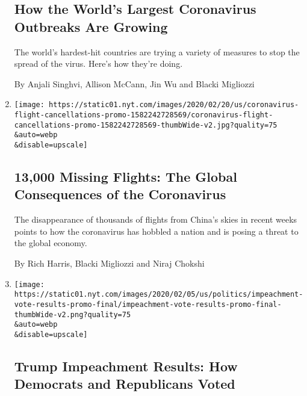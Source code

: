 \begin{enumerate}
  \hypertarget{how-the-worlds-largest-coronavirus-outbreaks-are-growing}{%
  \subsection{How the World's Largest Coronavirus Outbreaks Are
  Growing}\label{how-the-worlds-largest-coronavirus-outbreaks-are-growing}}

  The world's hardest-hit countries are trying a variety of measures to
  stop the spread of the virus. Here's how they're doing.

  By Anjali Singhvi, Allison McCann, Jin Wu and Blacki Migliozzi
\item
  \href{/interactive/2020/02/21/business/coronavirus-airline-travel.html}{}

  \texttt{[image: https://static01.nyt.com/images/2020/02/20/us/coronavirus-flight-cancellations-promo-1582242728569/coronavirus-flight-cancellations-promo-1582242728569-thumbWide-v2.jpg?quality=75\\\&auto=webp\\\&disable=upscale]}

  \hypertarget{13000-missing-flights-the-global-consequences-of-the-coronavirus}{%
  \subsection{13,000 Missing Flights: The Global Consequences of the
  Coronavirus}\label{13000-missing-flights-the-global-consequences-of-the-coronavirus}}

  The disappearance of thousands of flights from China's skies in recent
  weeks points to how the coronavirus has hobbled a nation and is posing
  a threat to the global economy.

  By Rich Harris, Blacki Migliozzi and Niraj Chokshi
\item
  \href{/interactive/2020/02/05/us/politics/impeachment-vote-results.html}{}

  \texttt{[image: https://static01.nyt.com/images/2020/02/05/us/politics/impeachment-vote-results-promo-final/impeachment-vote-results-promo-final-thumbWide-v2.png?quality=75\\\&auto=webp\\\&disable=upscale]}

  \hypertarget{trump-impeachment-results-how-democrats-and-republicans-voted}{%
  \subsection{Trump Impeachment Results: How Democrats and Republicans
  Voted}\label{trump-impeachment-results-how-democrats-and-republicans-voted}}


\end{enumerate}
